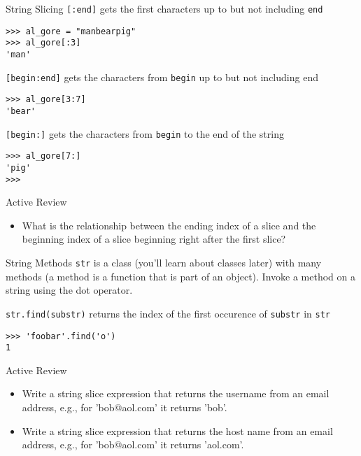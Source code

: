 \documentclass[smaller, aspectratio=1610]{beamer}
\begin{document}
\begin{frame}[label={sec:org29f4c31},fragile]{String Slicing}
 \texttt{[:end]} gets the first characters up to but not including \texttt{end}

\lstset{language=Python,label= ,caption= ,captionpos=b,numbers=none}
\begin{lstlisting}
>>> al_gore = "manbearpig"
>>> al_gore[:3]
'man'
\end{lstlisting}

\texttt{[begin:end]} gets the characters from \texttt{begin} up to but not including end

\lstset{language=Python,label= ,caption= ,captionpos=b,numbers=none}
\begin{lstlisting}
>>> al_gore[3:7]
'bear'
\end{lstlisting}

\texttt{[begin:]} gets the characters from \texttt{begin} to the end of the string

\lstset{language=Python,label= ,caption= ,captionpos=b,numbers=none}
\begin{lstlisting}
>>> al_gore[7:]
'pig'
>>>
\end{lstlisting}

\begin{block}{Active Review}
\begin{itemize}
\item What is the relationship between the ending index of a slice and the beginning index of a slice beginning right after the first slice?
\end{itemize}
\end{block}
\end{frame}

\begin{frame}[label={sec:orgcfb24ca},fragile]{String Methods}
 \texttt{str} is a class (you'll learn about classes later) with many methods (a method is a function that is part of an object). Invoke a method on a string using the dot operator.

\texttt{str.find(substr)} returns the index of the first occurence of
\texttt{substr} in \texttt{str}

\lstset{language=Python,label= ,caption= ,captionpos=b,numbers=none}
\begin{lstlisting}
>>> 'foobar'.find('o')
1
\end{lstlisting}

\begin{block}{Active Review}
\begin{itemize}
\item Write a string slice expression that returns the username from an email address, e.g., for 'bob@aol.com' it returns 'bob'.
\item Write a string slice expression that returns the host name from an email address, e.g., for 'bob@aol.com' it returns 'aol.com'.
\end{itemize}
\end{block}
\end{frame}
\end{document}
